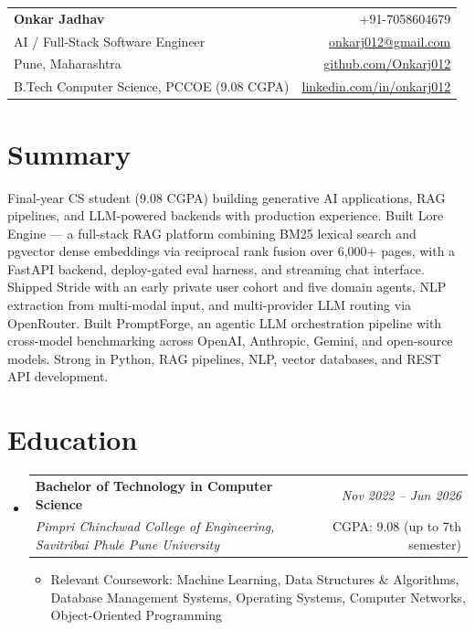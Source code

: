 \documentclass[a4paper,11pt]{article}
\makeatletter
\newcommand{\resumeSubheading}[4]{
\vspace{0.5mm}\item
    \begin{tabular*}{0.98\textwidth}[t]{l@{\extracolsep{\fill}}r}
        \textbf{#1} & \textit{\footnotesize{#4}} \\
        \textit{\footnotesize{#3}} & \footnotesize{#2}\\
    \end{tabular*}
    \vspace{-2.4mm}
}
\newcommand{\resumeSubHeadingListStart}{\begin{itemize}[leftmargin=*,labelsep=0mm]}
\newcommand{\resumeItemListStart}{\begin{justify}\begin{itemize}[leftmargin=3ex, rightmargin=2ex, noitemsep,labelsep=1.2mm,itemsep=0mm]\small}
\newcommand{\resumeSubHeadingListEnd}{\end{itemize}\vspace{2mm}}
\newcommand{\resumeItemListEnd}{\end{itemize}\end{justify}\vspace{-2mm}}
\newcommand{\name}{Onkar Jadhav}
\newcommand{\phone}{7058604679}
\newcommand{\emaila}{onkarj012@gmail.com}
\newcommand{\github}{github.com/Onkarj012}
\newcommand{\linkedin}{linkedin.com/in/onkarj012}
\makeatother
\begin{document}
\begin{tabularx}{\linewidth}{L r}
  \textbf{\Large \name} & {+91-\phone} \\
  {AI / Full-Stack Software Engineer} & \href{mailto:\emaila}{\emaila} \\
  {Pune, Maharashtra} & \href{https://\github}{\github} \\
  {B.Tech Computer Science, PCCOE (9.08 CGPA)} & \href{https://\linkedin}{\linkedin}
\end{tabularx}
\vspace{-4mm}

\section{\textbf{Summary}}
\vspace{1mm}
\small{
Final-year CS student (9.08 CGPA) building generative AI applications, RAG pipelines, and LLM-powered backends with production experience. Built Lore Engine --- a full-stack RAG platform combining BM25 lexical search and pgvector dense embeddings via reciprocal rank fusion over 6,000+ pages, with a FastAPI backend, deploy-gated eval harness, and streaming chat interface. Shipped Stride with an early private user cohort and five domain agents, NLP extraction from multi-modal input, and multi-provider LLM routing via OpenRouter. Built PromptForge, an agentic LLM orchestration pipeline with cross-model benchmarking across OpenAI, Anthropic, Gemini, and open-source models. Strong in Python, RAG pipelines, NLP, vector databases, and REST API development.
}
\vspace{-3mm}

\section{\textbf{Education}}
  \resumeSubHeadingListStart
    \resumeSubheading
      {Bachelor of Technology in Computer Science}{CGPA: 9.08 (up to 7th semester)}
      {Pimpri Chinchwad College of Engineering, Savitribai Phule Pune University}{Nov 2022 -- Jun 2026}
      \resumeItemListStart
        \item {Relevant Coursework: Machine Learning, Data Structures \& Algorithms, Database Management Systems, Operating Systems, Computer Networks, Object-Oriented Programming}
      \resumeItemListEnd
  \resumeSubHeadingListEnd
\vspace{-5.5mm}
\end{document}
